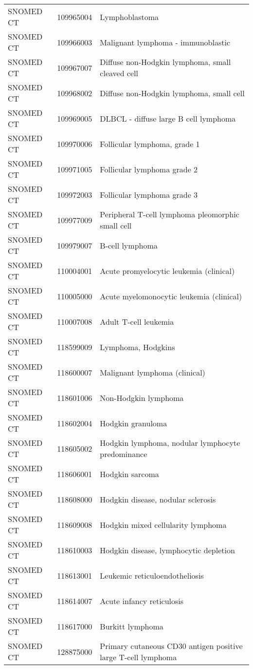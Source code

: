 \begin{longtable}{p{}p{}p{}}
  SNOMED CT & 109965004 & Lymphoblastoma \\ 
  SNOMED CT & 109966003 & Malignant lymphoma - immunoblastic \\ 
  SNOMED CT & 109967007 & Diffuse non-Hodgkin lymphoma, small cleaved cell \\ 
  SNOMED CT & 109968002 & Diffuse non-Hodgkin lymphoma, small cell \\ 
  SNOMED CT & 109969005 & DLBCL - diffuse large B cell lymphoma \\ 
  SNOMED CT & 109970006 & Follicular lymphoma, grade 1 \\ 
  SNOMED CT & 109971005 & Follicular lymphoma grade 2 \\ 
  SNOMED CT & 109972003 & Follicular lymphoma grade 3 \\ 
  SNOMED CT & 109977009 & Peripheral T-cell lymphoma pleomorphic small cell \\ 
  SNOMED CT & 109979007 & B-cell lymphoma \\ 
  SNOMED CT & 110004001 & Acute promyelocytic leukemia (clinical) \\ 
  SNOMED CT & 110005000 & Acute myelomonocytic leukemia (clinical) \\ 
  SNOMED CT & 110007008 & Adult T-cell leukemia \\ 
  SNOMED CT & 118599009 & Lymphoma, Hodgkins \\ 
  SNOMED CT & 118600007 & Malignant lymphoma (clinical) \\ 
  SNOMED CT & 118601006 & Non-Hodgkin lymphoma \\ 
  SNOMED CT & 118602004 & Hodgkin granuloma \\ 
  SNOMED CT & 118605002 & Hodgkin lymphoma, nodular lymphocyte predominance \\ 
  SNOMED CT & 118606001 & Hodgkin sarcoma \\ 
  SNOMED CT & 118608000 & Hodgkin disease, nodular sclerosis \\ 
  SNOMED CT & 118609008 & Hodgkin mixed cellularity lymphoma \\ 
  SNOMED CT & 118610003 & Hodgkin disease, lymphocytic depletion \\ 
  SNOMED CT & 118613001 & Leukemic reticuloendotheliosis \\ 
  SNOMED CT & 118614007 & Acute infancy reticulosis \\ 
  SNOMED CT & 118617000 & Burkitt lymphoma \\ 
  SNOMED CT & 128875000 & Primary cutaneous CD30 antigen positive large T-cell lymphoma \\ 

\end{longtable}
